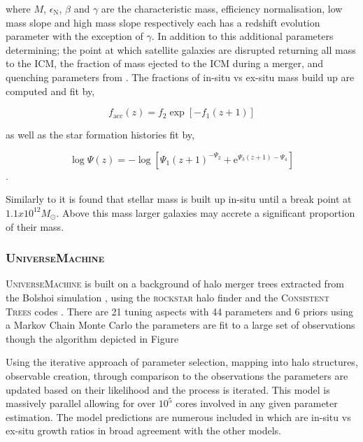 where $M$, $\epsilon_{\mathrm{N}}$, $\beta$ and $\gamma$ are the characteristic mass, efficiency normalisation, low mass slope and high mass slope respectively each has a redshift evolution parameter with the exception of $\gamma$. In addition to this additional parameters determining; the point at which satellite galaxies are disrupted returning all mass to the ICM, the fraction of mass ejected to the ICM during a merger, and quenching parameters from \citet{Wetzel2013GalaxyUniverse}. The fractions of in-situ vs ex-situ mass build up are computed and fit by,

\begin{equation}
f_{\mathrm{acc}}(z) =f_{2} \exp \left[-f_{1}(z+1)\right] 
\end{equation}

as well as the star formation histories fit by,

\begin{equation}
\log \Psi(z) =-\log \left[\Psi_{1}(z+1)^{-\Psi_{2}}+\mathrm{e}^{\Psi_{3}(z+1)-\Psi_{4}}\right] 
\end{equation}.

Similarly to \citet{Rodriguez-Puebla2017ConstrainingProperties} it is found that stellar mass is built up in-situ until a break point at $1.1 x 10^{12} M_{\odot}$. Above this mass larger galaxies may accrete a significant proportion of their mass.

\subsubsection{U\textsc{niverse}M\textsc{achine}}
U\textsc{niverse}M\textsc{achine} is built on a background of halo merger trees extracted from the Bolshoi simulation \citep{Klypin2016,Rodriguez-Puebla2016HaloSimulations}, using the \textsc{rockstar} halo finder and the C\textsc{onsistent} T\textsc{rees} codes \cite{Behroozi2013TheCores, Behroozi2013GRAVITATIONALLYCOSMOLOGY}. There are 21 tuning aspects with 44 parameters and 6 priors using a Markov Chain Monte Carlo the parameters are fit to a large set of observations though the algorithm depicted in Figure %


Using the iterative approach of parameter selection, mapping into halo structures, observable creation, through comparison to the observations the parameters are updated based on their likelihood and the process is iterated. This model is massively parallel allowing for over $10^{5}$ cores involved in any given parameter estimation. The model predictions are numerous included in which are in-situ vs ex-situ growth ratios in broad agreement with the other models.


